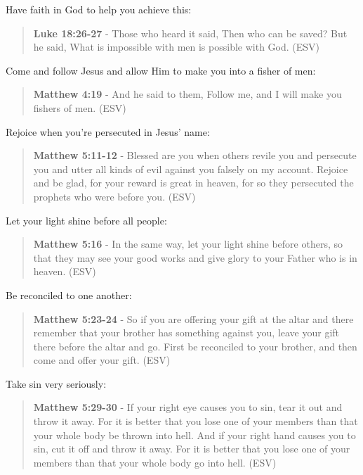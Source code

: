 \documentclass[11pt]{article}
\begin{document}
Have faith in God to help you achieve this:

\begin{quote}
\textbf{Luke 18:26-27} - Those who heard it said, Then who can be saved? But he said, What is impossible with men is possible with God. (ESV)
\end{quote}

Come and follow Jesus and allow Him to make you into a fisher of men:

\begin{quote}
\textbf{Matthew 4:19} - And he said to them, Follow me, and I will make you fishers of men. (ESV)
\end{quote}

Rejoice when you're persecuted in Jesus' name:

\begin{quote}
\textbf{Matthew 5:11-12} - Blessed are you when others revile you and persecute you and utter all kinds of evil against you falsely on my account. Rejoice and be glad, for your reward is great in heaven, for so they persecuted the prophets who were before you. (ESV)
\end{quote}

Let your light shine before all people:

\begin{quote}
\textbf{Matthew 5:16} - In the same way, let your light shine before others, so that they may see your good works and give glory to your Father who is in heaven. (ESV)
\end{quote}

Be reconciled to one another:

\begin{quote}
\textbf{Matthew 5:23-24} - So if you are offering your gift at the altar and there remember that your brother has something against you, leave your gift there before the altar and go. First be reconciled to your brother, and then come and offer your gift. (ESV)
\end{quote}

Take sin very seriously:

\begin{quote}
\textbf{Matthew 5:29-30} - If your right eye causes you to sin, tear it out and throw it away. For it is better that you lose one of your members than that your whole body be thrown into hell. And if your right hand causes you to sin, cut it off and throw it away. For it is better that you lose one of your members than that your whole body go into hell. (ESV)
\end{quote}
\end{document}

